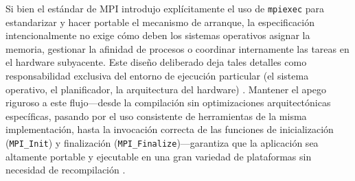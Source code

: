 Si bien el estándar de MPI introdujo explícitamente el uso de \texttt{mpiexec} para estandarizar y hacer portable el mecanismo de arranque, la especificación intencionalmente no exige cómo deben los sistemas operativos asignar la memoria, gestionar la afinidad de procesos o coordinar internamente las tareas en el hardware subyacente. Este diseño deliberado deja tales detalles como responsabilidad exclusiva del entorno de ejecución particular (el sistema operativo, el planificador, la arquitectura del hardware) \cite{mpi_forum_2025, gropp_using_mpi_1999}. Mantener el apego riguroso a este flujo—desde la compilación sin optimizaciones arquitectónicas específicas, pasando por el uso consistente de herramientas de la misma implementación, hasta la invocación correcta de las funciones de inicialización (\texttt{MPI\_Init}) y finalización (\texttt{MPI\_Finalize})—garantiza que la aplicación sea altamente portable y ejecutable en una gran variedad de plataformas sin necesidad de recompilación \cite{mpi_forum_2025}.
